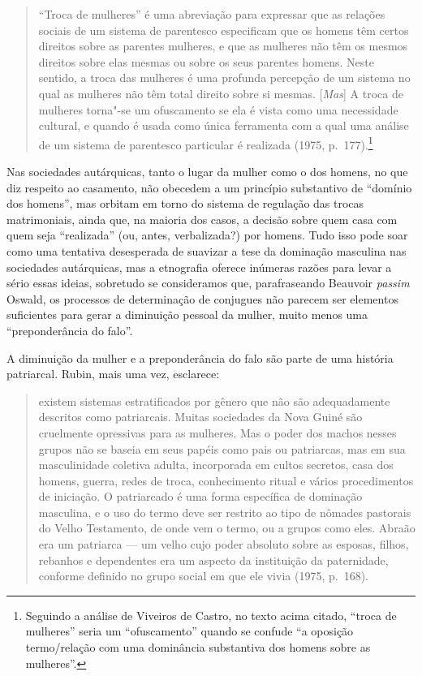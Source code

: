 \begin{quote}
``Troca de mulheres'' é uma abreviação para expressar que as relações
sociais de um sistema de parentesco especificam que os homens têm certos
direitos sobre as parentes mulheres, e que as mulheres não têm os mesmos
direitos sobre elas mesmas ou sobre os seus parentes homens. Neste
sentido, a troca das mulheres é uma profunda percepção de um sistema no
qual as mulheres não têm total direito sobre si mesmas. {[}\emph{Mas}{]}
A troca de mulheres torna"-se um ofuscamento se ela é vista como uma
necessidade cultural, e quando é usada como única ferramenta com a qual
uma análise de um sistema de parentesco particular é
realizada (1975, p.~177).\footnote{Seguindo a análise de Viveiros
  de Castro, no texto acima citado, ``troca de mulheres'' seria um
  ``ofuscamento'' quando se confude ``a oposição termo/relação com uma
  dominância substantiva dos homens sobre as mulheres''.}
\end{quote}

Nas sociedades autárquicas, tanto o lugar da mulher como o dos homens,
no que diz respeito ao casamento, não obecedem a um princípio
substantivo de ``domínio dos homens'', mas orbitam em torno do sistema
de regulação das trocas matrimoniais, ainda que, na maioria dos casos, a
decisão sobre quem casa com quem seja ``realizada'' (ou, antes,
verbalizada?) por homens. Tudo isso pode soar como uma tentativa
desesperada de suavizar a tese da dominação masculina nas sociedades
autárquicas, mas a etnografia oferece inúmeras razões para levar a sério
essas ideias, sobretudo se consideramos que, parafraseando Beauvoir
\emph{passim} Oswald, os processos de determinação de conjugues não
parecem ser elementos suficientes para gerar a diminuição pessoal da
mulher, muito menos uma ``preponderância do falo''.

A diminuição da mulher e a preponderância do falo são parte de uma
história patriarcal. Rubin, mais uma vez, esclarece:

\begin{quote}
existem sistemas estratificados por gênero que não são adequadamente
descritos como patriarcais. Muitas sociedades da Nova Guiné são
cruelmente opressivas para as mulheres. Mas o poder dos machos nesses
grupos não se baseia em seus papéis como pais ou patriarcas, mas em sua
masculinidade coletiva adulta, incorporada em cultos secretos, casa dos
homens, guerra, redes de troca, conhecimento ritual e vários
procedimentos de iniciação. O patriarcado é uma forma específica de
dominação masculina, e o uso do termo deve ser restrito ao tipo de
nômades pastorais do Velho Testamento, de onde vem o termo, ou a grupos
como eles. Abraão era um patriarca --- um velho cujo poder absoluto sobre
as esposas, filhos, rebanhos e dependentes era um aspecto da instituição
da paternidade, conforme definido no grupo social em que ele
vivia (1975, p.~168).
\end{quote}

